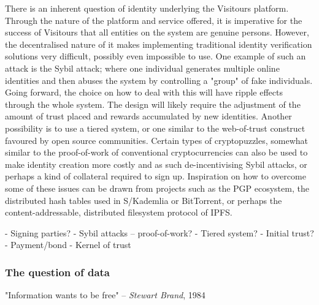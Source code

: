 \documentclass[fontsize=12pt,a4paper]{article}
\begin{document}
There is an inherent question of identity underlying the Visitours platform. Through the nature of the platform and service offered, it is imperative for the success of Visitours that all entities on the system are genuine persons. However, the decentralised nature of it makes implementing traditional identity verification solutions very difficult, possibly even impossible to use. One example of such an attack is the Sybil attack; where one individual generates multiple online identities and then abuses the system by controlling a "group" of fake individuals. Going forward, the choice on how to deal with this will have ripple effects through the whole system. The design will likely require the adjustment of the amount of trust placed and rewards accumulated by new identities. Another possibility is to use a tiered system, or one similar to the web-of-trust construct favoured by open source communities. Certain types of cryptopuzzles, somewhat similar to the proof-of-work of conventional cryptocurrencies can also be used to make identity creation more costly and as such de-incentivising Sybil attacks, or perhaps a kind of collateral required to sign up. Inspiration on how to overcome some of these issues can be drawn from projects such as the PGP ecosystem, the distributed hash tables used in S/Kademlia or BitTorrent, or perhaps the content-addressable, distributed filesystem protocol of IPFS.

- Signing parties?
- Sybil attacks -- proof-of-work?
- Tiered system?
- Initial trust?
- Payment/bond
- Kernel of trust

\subsubsection*{The question of data}
 
"Information wants to be free" -- \textit{Stewart Brand}, 1984 \newline
\end{document}
